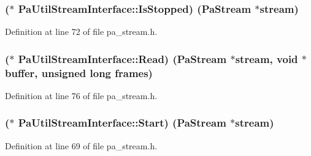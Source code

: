 \subsubsection[{\texorpdfstring{Is\+Stopped}{IsStopped}}]{($\ast$ Pa\+Util\+Stream\+Interface\+::\+Is\+Stopped) ({\bf Pa\+Stream} $\ast$stream)}\hypertarget{struct_pa_util_stream_interface_a54ccc28cea56fa30061a23f5566ea905}{}\label{struct_pa_util_stream_interface_a54ccc28cea56fa30061a23f5566ea905}


Definition at line 72 of file pa\+\_\+stream.\+h.

\subsubsection[{\texorpdfstring{Read}{Read}}]{($\ast$ Pa\+Util\+Stream\+Interface\+::\+Read) ({\bf Pa\+Stream} $\ast$stream, {\bf void} $\ast${\bf buffer}, unsigned long frames)}\hypertarget{struct_pa_util_stream_interface_a01efcb469d7599b6c01e022d818d733a}{}\label{struct_pa_util_stream_interface_a01efcb469d7599b6c01e022d818d733a}


Definition at line 76 of file pa\+\_\+stream.\+h.

\subsubsection[{\texorpdfstring{Start}{Start}}]{($\ast$ Pa\+Util\+Stream\+Interface\+::\+Start) ({\bf Pa\+Stream} $\ast$stream)}\hypertarget{struct_pa_util_stream_interface_acd5390ba9ec8a7eef702d9b08969331f}{}\label{struct_pa_util_stream_interface_acd5390ba9ec8a7eef702d9b08969331f}


Definition at line 69 of file pa\+\_\+stream.\+h.

